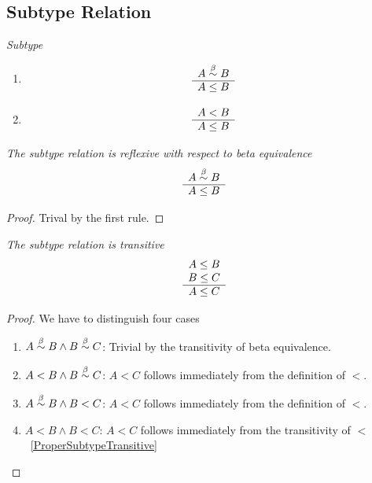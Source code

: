 \subsection{Subtype Relation}


\begin{definition}
    \emph{Subtype}
    \begin{enumerate}
    \item
        $$
        \begin{array}{c} 
            A \stackrel{\beta}{\sim} B
         \\ \hline 
            A \le B
        \end{array}
        $$

    \item
        $$
        \begin{array}{c} 
            A < B
         \\ \hline 
            A \le B
        \end{array}
        $$
    \end{enumerate}
\end{definition}


\begin{theorem}
    \emph{The subtype relation is reflexive with respect to beta equivalence}
    $$
    \begin{array}{c} 
        A \stackrel{\beta}{\sim} B
     \\ \hline 
        A \le B
    \end{array}
    $$
    \begin{proof} Trival by the first rule.
    \end{proof}
\end{theorem}






\begin{theorem}
    \emph{The subtype relation is transitive}
    $$
    \begin{array}{c} 
        A \le B
        \\
        B \le C
     \\ \hline 
        A \le C
    \end{array}
    $$
    \begin{proof}
        We have to distinguish four cases
        \begin{enumerate}
        \item $A \stackrel{\beta}{\sim} B \land B \stackrel{\beta}{\sim} C$: Trivial by the transitivity of
            beta equivalence.

        \item $A < B \land B \stackrel{\beta}{\sim} C$: $A < C$ follows immediately from the
            definition of $<$.

        \item $A \stackrel{\beta}{\sim} B \land B < C$: $A < C$ follows immediately from the
            definition of $<$.

        \item $A < B \land B < C$: $A < C$ follows immediately from the
            transitivity of $<$~\ref{ProperSubtypeTransitive}
        \end{enumerate}
    \end{proof}
\end{theorem}


